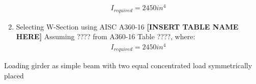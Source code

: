 \documentclass{report} %
\begin{document}
\begin{enumerate}
        \begin{equation*}
            \begin{aligned}
                I_{required} = 2450in^4
            \end{aligned}
        \end{equation*}
    \item Selecting W-Section using AISC A360-16 \textbf{[INSERT TABLE NAME HERE]}
    Assuming ???? from A360-16 Table ????, where:
        \begin{equation*}
            \begin{aligned}
                I_{required} = 2450in^4
            \end{aligned}
        \end{equation*}
\end{enumerate}
\begin{center}
\end{center}
Loading girder as simple beam with two equal concentrated load symmetrically placed  
\end{document}
